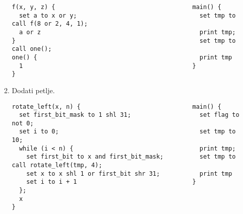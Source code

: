 \documentclass[a4paper]{article}
\begin{document}
\begin{enumerate}
\begin{enumerate}
\begin{verbatim}
f(x, y, z) {                                      main() {
  set a to x or y;                                  set tmp to call f(8 or 2, 4, 1);
  a or z                                            print tmp;
}                                                   set tmp to call one();
one() {                                             print tmp
  1                                               }
}
\end{verbatim}

\item Dodati petlje.

\begin{verbatim}
rotate_left(x, n) {                               main() {
  set first_bit_mask to 1 shl 31;                   set flag to not 0;
  set i to 0;                                       set tmp to 10;
  while (i < n) {                                   print tmp;
    set first_bit to x and first_bit_mask;          set tmp to call rotate_left(tmp, 4);
    set x to x shl 1 or first_bit shr 31;           print tmp
    set i to i + 1                                }
  };
  x
}
\end{verbatim}

\end{enumerate}

\end{enumerate}
\end{document}
